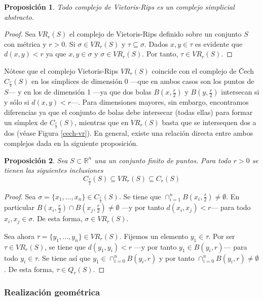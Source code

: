 \documentclass[12pt,a4paper,twoside]{article} %
\theoremstyle{plain}
\newtheorem{proposicion}{Proposición}[subsection]
\theoremstyle{definition}
\newcommand{\R}{\mathbb{R}}
\begin{document}
\begin{proposicion}
Todo complejo de Vietoris-Rips es un complejo simplicial abstracto.
\end{proposicion}

\begin{proof}
Sea $VR_r(S)$ el complejo de Vietoris-Rips definido sobre un conjunto $S$ con métrica y $r > 0$. Si $\sigma \in VR_r(S)$ y $\tau \subseteq \sigma$. Dados $x,y \in \tau$ es evidente que $d(x,y)<r$ ya que $x,y \in \sigma$ y $\sigma \in VR_r(S)$. Por tanto, $\tau \in VR_r(S)$.
\end{proof}

Nótese que el complejo Vietoris-Rips $VR_r(S)$ coincide con el complejo de Čech $C_\frac{r}{2}(S)$ en los símplices de dimensión 0 ---que en ambos casos son los puntos de $S$--- y en los de dimensión 1 ---ya que dos bolas $B(x,\frac{r}{2})$ y $B(y,\frac{r}{2})$ intersecan si y sólo si $d(x,y) < r$---. Para dimensiones mayores, sin embargo, encontramos diferencias ya que el conjunto de bolas debe intersecar (todas ellas) para formar un símplex de $C_\frac{r}{2}(S)$, mientras que en $VR_r(S)$ basta que se intersequen dos a dos (véase Figura \ref{cech-vr}). En general, existe una relación directa entre ambos complejos dada en la siguiente proposición.

\begin{proposicion}
Sea $S\subset\R^n$ una un conjunto finito de puntos. Para todo $r>0$ se tienen las siguientes inclusiones
$$ C_{\frac{r}{2}}(S) \subseteq VR_r(S) \subseteq C_r(S) $$
\end{proposicion}

\begin{proof}
Sea $\sigma=\{ x_1,\dots,x_n \} \in C_{\frac{r}{2}}(S)$. Se tiene que $\cap_{i=1}^n B(x_i,\frac{r}{2}) \neq \emptyset$. En particular $B(x_i,\frac{r}{2}) \cap B(x_j,\frac{r}{2}) \neq \emptyset$ ---y por tanto $d(x_i,x_j) < r$--- para todo $x_i,x_j \in \sigma$. De esta forma, $\sigma \in VR_r(S)$.

Sea ahora $\tau=\{ y_1,\dots,y_n \} \in VR_r(S)$. Fijemos un elemento $y_1\in \tau$. Por ser $\tau\in VR_r(S)$, se tiene que $d(y_1,y_i) < r$ ---y por tanto $y_1 \in B(y_i, r)$--- para todo $y_i \in \tau$. Se tiene así que $y_1 \in \cap_{i=0}^n B(y_i,r)$ y por tanto $\cap_{i=0}^n B(y_i,r) \neq \emptyset$. De esta forma, $\tau \in Q_r(S)$.
\end{proof}

\subsubsection{Realización geométrica}
\end{document}
